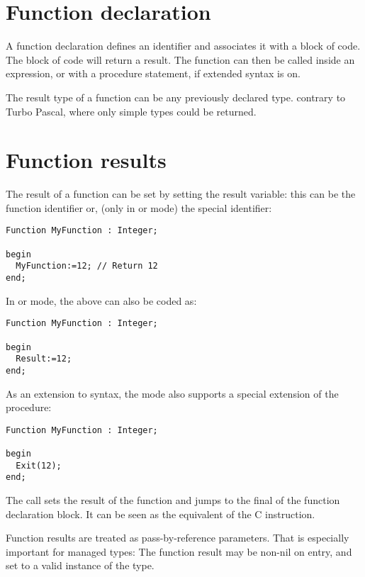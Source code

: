 \section{Function declaration}
A function declaration defines an identifier and associates it with a
block of code. The block of code will return a result.
The function can then be called inside an expression, or with a procedure
statement, if extended syntax is on.

The result type of a function can be any previously declared type.
contrary to Turbo Pascal, where only simple types could be returned.

\section{Function results}
The result of a function can be set by setting the result variable:
this can be the function identifier or, (only in  or  mode) 
the special  identifier:
\begin{verbatim}
Function MyFunction : Integer;

begin
  MyFunction:=12; // Return 12
end;
\end{verbatim}
In  or  mode, the above can also be coded as:
\begin{verbatim}
Function MyFunction : Integer;

begin
  Result:=12;
end;
\end{verbatim}
As an extension to \delphi syntax, the  mode also supports a special
extension of the  procedure:
\begin{verbatim}
Function MyFunction : Integer;

begin
  Exit(12);
end;
\end{verbatim}
The  call sets the result of the function and jumps to the final
 of the function declaration block. It can be seen as the equivalent 
of the C  instruction.

\begin{remark}
Function results are treated as pass-by-reference parameters. 
That is especially important for managed types: 
The function result may be non-nil on entry, and set to a valid instance of the type.
\end{remark}

